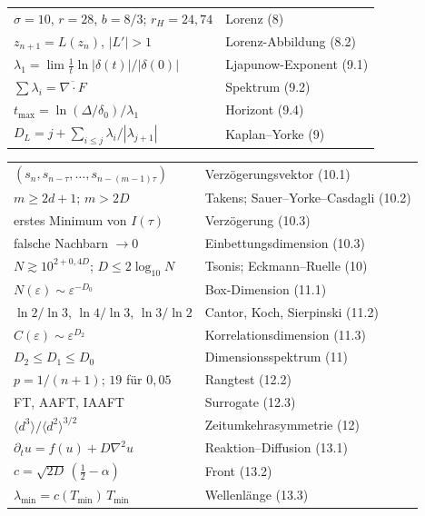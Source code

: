 \begin{merksatz}
\begin{center}
{\begin{tabular}{@{}P{4.6cm}P{4.0cm}@{}}
$\sigma = 10$, $r = 28$, $b = 8/3$; $r_H = 24{,}74$ & Lorenz (8)\\
$z_{n+1} = L(z_n)$, $|L'| > 1$ & Lorenz-Abbildung (8.2)\\
$\lambda_1 = \lim\frac1t\ln|\delta(t)|/|\delta(0)|$ & Ljapunow-Exponent (9.1)\\
$\sum\lambda_i = \overline{\nabla\!\cdot\!F}$ & Spektrum (9.2)\\
$t_{\max} = \ln(\Delta/\delta_0)/\lambda_1$ & Horizont (9.4)\\
$D_L = j + \sum_{i\le j}\lambda_i/|\lambda_{j+1}|$ & Kaplan--Yorke (9)\\
\bottomrule
\end{tabular}}
\end{center}
\end{merksatz}

\begin{merksatz}
\begin{center}
{\small
\renewcommand{\arraystretch}{1.6}
\begin{tabular}{@{}P{4.6cm}P{4.0cm}@{}}
\toprule
$(s_n, s_{n-\tau}, \ldots, s_{n-(m-1)\tau})$ & Verzögerungsvektor (10.1)\\
$m \ge 2d + 1$; $m > 2D$ & Takens; Sauer--Yorke--Casdagli (10.2)\\
erstes Minimum von $I(\tau)$ & Verzögerung (10.3)\\
falsche Nachbarn $\to 0$ & Einbettungsdimension (10.3)\\
$N \gtrsim 10^{2+0{,}4D}$; $D \le 2\log_{10}N$ & Tsonis; Eckmann--Ruelle (10)\\
$N(\varepsilon)\sim\varepsilon^{-D_0}$ & Box-Dimension (11.1)\\
$\ln2/\ln3$, $\ln4/\ln3$, $\ln3/\ln2$ & Cantor, Koch, Sierpinski (11.2)\\
$C(\varepsilon)\sim\varepsilon^{D_2}$ & Korrelationsdimension (11.3)\\
$D_2 \le D_1 \le D_0$ & Dimensionsspektrum (11)\\
$p = 1/(n+1)$; $19$ für $0{,}05$ & Rangtest (12.2)\\
FT, AAFT, IAAFT & Surrogate (12.3)\\
$\langle d^{3}\rangle/\langle d^{2}\rangle^{3/2}$ & Zeitumkehrasymmetrie (12)\\
$\partial_t u = f(u) + D\nabla^{2}u$ & Reaktion--Diffusion (13.1)\\
$c = \sqrt{2D}\,(\tfrac12 - \alpha)$ & Front (13.2)\\
$\lambda_{\min} = c(T_{\min})\,T_{\min}$ & Wellenlänge (13.3)\\

\end{tabular}}
\end{center}
\end{merksatz}
